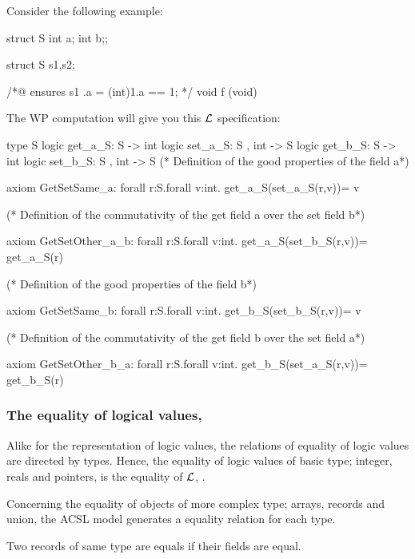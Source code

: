 Consider the following example: %
 \begin{ccode}
   struct S {int a; int b;};

   struct S s1,s2; 
   
   /*@
   ensures {s1 \with .a = (int)1}.a == 1;  
   */
   void f (void) {}
 \end{ccode}

 The WP computation will give you this $\cal{L}$ specification:
\begin{whycode}
type S
logic get_a_S: S -> int 
logic set_a_S: S , int -> S 
logic get_b_S: S -> int 
logic set_b_S: S , int -> S 
(* Definition of the good properties of the field a*)

axiom GetSetSame_a:
forall r:S.forall v:int.
get_a_S(set_a_S(r,v))=
 v


(* Definition of the commutativity of the get field a over the set field b*)

axiom GetSetOther_a_b:
forall r:S.forall v:int.
get_a_S(set_b_S(r,v))=
 get_a_S(r)



(* Definition of the good properties of the field b*)

axiom GetSetSame_b:
forall r:S.forall v:int.
get_b_S(set_b_S(r,v))=
 v


(* Definition of the commutativity of the get field b over the set field a*)

axiom GetSetOther_b_a:
forall r:S.forall v:int.
get_b_S(set_a_S(r,v))=
 get_b_S(r)
\end{whycode}

 

 \subsubsection{The equality of logical values, }\label{ssec-acsl-eq}
 
 Alike for the representation of logic values, the relations of 
 equality of logic values are directed by types. Hence, 
 the equality of logic values of basic type; integer, reals and pointers,
 is the equality of $\cal{L}$, \whyinline{=}. 
 
 Concerning the equality of objects of more complex type; arrays, records 
 and union, the \textsf{ACSL} model generates a equality 
 relation for each type. \par
 
 Two records of same type  are equals if their fields are equal. 
 
